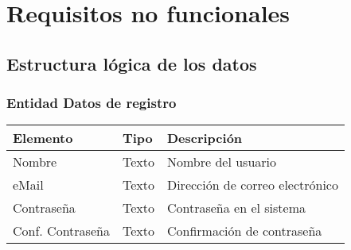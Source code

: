 \section{Requisitos no funcionales}

\subsection{Estructura lógica de los datos}

\subsubsection{Entidad Datos de registro}
\begin{tabularx}{0.9\textwidth}{llX}
\hline
\textbf{Elemento} & \textbf{Tipo} & \textbf{Descripción} \\
\hline
Nombre & Texto & Nombre del usuario \\
eMail & Texto & Dirección de correo electrónico \\
Contraseña & Texto & Contraseña en el sistema \\
Conf. Contraseña & Texto & Confirmación de contraseña \\
\hline
\end{tabularx}


